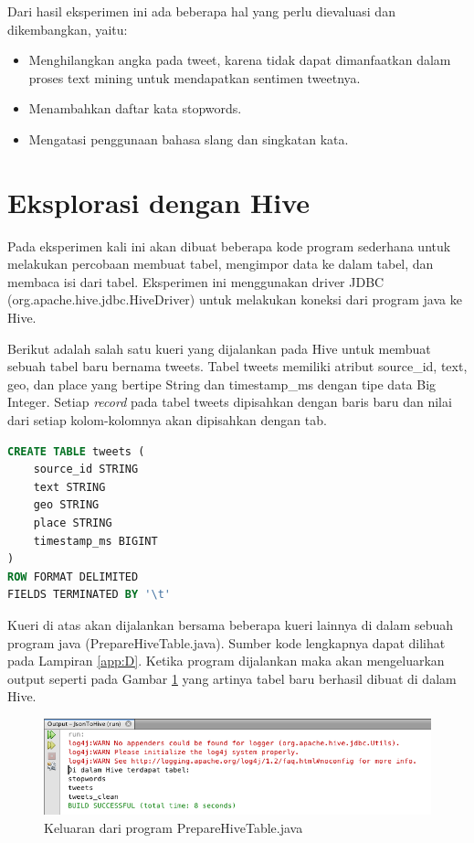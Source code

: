   
Dari hasil eksperimen ini ada beberapa hal yang perlu dievaluasi dan dikembangkan, yaitu:
\begin{itemize}
	\item Menghilangkan angka pada tweet, karena tidak dapat dimanfaatkan dalam proses text mining untuk mendapatkan sentimen tweetnya.
	\item Menambahkan daftar kata stopwords.
	\item Mengatasi penggunaan bahasa slang dan singkatan kata.
\end{itemize}

\section{Eksplorasi dengan Hive}
\label{sec:eksperimen-hive}
Pada eksperimen kali ini akan dibuat beberapa kode program sederhana untuk melakukan percobaan membuat tabel, mengimpor data ke dalam tabel, dan membaca isi dari tabel. Eksperimen ini menggunakan driver JDBC (org.apache.hive.jdbc.HiveDriver) untuk melakukan koneksi dari program java ke Hive. 

Berikut adalah salah satu kueri yang dijalankan pada Hive untuk membuat sebuah tabel baru bernama tweets. Tabel tweets memiliki atribut source\_id, text, geo, dan place yang bertipe String dan timestamp\_ms dengan tipe data Big Integer. Setiap \textit{record} pada tabel tweets dipisahkan dengan baris baru dan nilai dari setiap kolom-kolomnya akan dipisahkan dengan tab.

\begin{lstlisting}[language=sql,basicstyle=\small,caption=Kueri Hive untuk Membuat Tabel tweets]
CREATE TABLE tweets (
    source_id STRING
    text STRING
    geo STRING
    place STRING
    timestamp_ms BIGINT
) 
ROW FORMAT DELIMITED 
FIELDS TERMINATED BY '\t'
\end{lstlisting}

Kueri di atas akan dijalankan bersama beberapa kueri lainnya di dalam sebuah program java (PrepareHiveTable.java). Sumber kode lengkapnya dapat dilihat pada Lampiran \ref{app:D}. Ketika program dijalankan maka akan mengeluarkan output seperti pada Gambar \ref{fig:output-preparetable-hive} yang artinya tabel baru berhasil dibuat di dalam Hive. 

\begin{figure}
	\centering
	\includegraphics[scale=0.5]{Gambar/output-preparetable-hive.png}
	\caption[Keluaran dari program PrepareHiveTable.java]{Keluaran dari program PrepareHiveTable.java}
	\label{fig:output-preparetable-hive}
\end{figure}

